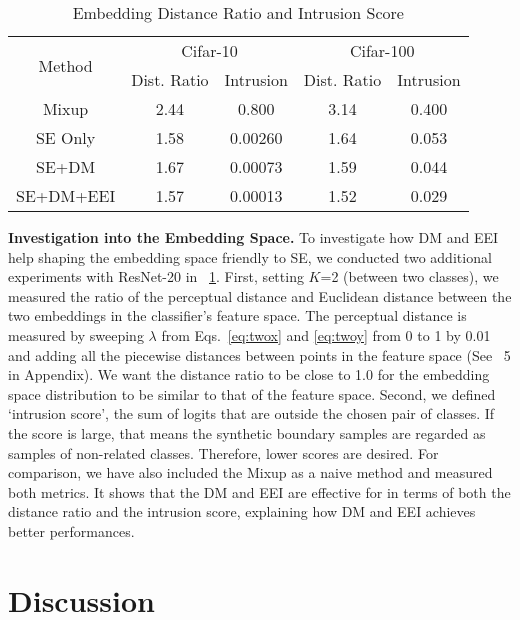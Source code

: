 \documentclass{article}
\newcommand{\rev}[1]{{\color{olivegreen}#1}}
\renewcommand{\rev}[1]{#1}
\begin{document}
 \rev{
\begin{table}[]
\rev{
    \centering


    \caption{Embedding Distance Ratio and Intrusion Score}
    \label{tab:embedding}
    


    \begin{tabular}{ccccc}
    \toprule
    \multirow{2}{*}{Method} & \multicolumn{2}{c}{Cifar-10} & \multicolumn{2}{c}{Cifar-100} \\
    \cmidrule(lr){2-3}\cmidrule(lr){4-5}
    & Dist. Ratio & Intrusion & Dist. Ratio & Intrusion  \\
    \midrule
    Mixup & 2.44 & 0.800 & 3.14 & 0.400 \\
    SE Only & 1.58 & 0.00260 & 1.64 & 0.053 \\
    SE+DM & 1.67 & 0.00073 & 1.59 & 0.044 \\
    SE+DM+EEI & 1.57 & 0.00013 & 1.52 & 0.029 \\
      \bottomrule
      
    \end{tabular} 
    }
\end{table}

\textbf{Investigation into the Embedding Space.}
To investigate how DM and EEI help shaping the embedding space friendly to SE, we conducted two additional experiments with ResNet-20 in \tablename~\ref{tab:embedding}.
First, setting $K$=2 (between two classes), we measured the ratio of the perceptual distance and Euclidean distance between the two embeddings in the classifier’s feature space. 
The perceptual distance is measured by sweeping $\lambda$ from Eqs.~\ref{eq:twox} and \ref{eq:twoy} from 0 to 1 by 0.01 and adding all the piecewise distances between points in the feature space (See \figurename~5 in Appendix).
We want the distance ratio to be close to 1.0 for the embedding space distribution to be similar to that of the feature space. 
Second, we defined `intrusion score’, the sum of logits that are outside the chosen pair of classes. 
If the score is large, that means the synthetic boundary samples are regarded as samples of non-related classes. Therefore, lower scores are desired. 
For comparison, we have also included the Mixup as a naive method and measured both metrics. 
It shows that the DM and EEI are effective for in terms of both the distance ratio and the intrusion score, explaining how DM and EEI achieves better performances.


}

\section{Discussion}
\end{document}
